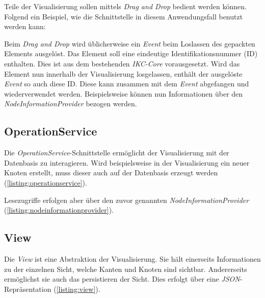 Teile der Visualisierung sollen mittels \textit{Drag and Drop} bedient werden können. Folgend ein Beispiel, wie die Schnittstelle in diesem Anwendungsfall benutzt werden kann:

Beim \textit{Drag and Drop} wird üblicherweise ein \textit{Event} beim Loslassen des gepackten Elements ausgelöst. Das Element soll eine eindeutige Identifikationsnummer (ID) enthalten. Dies ist aus dem bestehenden \textit{IKC-Core} vorausgesetzt. Wird das Element nun innerhalb der Visualisierung losgelassen, enthält der ausgelöste \textit{Event} so auch diese ID. Diese kann zusammen mit dem \textit{Event} abgefangen und wiederverwendet werden. Beispielsweise können nun Informationen über den \textit{NodeInformationProvider} bezogen werden.


\subsection{OperationService}
Die \textit{OperationService}-Schnittstelle ermöglicht der Visualisierung mit der Datenbasis zu interagieren. Wird beispielsweise in der Visualisierung ein neuer Knoten erstellt, muss dieser auch auf der Datenbasis erzeugt werden (\autoref{listing:operationservice}). 

Lesezugriffe erfolgen aber über den zuvor genannten \textit{NodeInformationProvider} (\autoref{listing:nodeinformationprovider}).


\subsection{View}
Die \textit{View} ist eine Abstraktion der Visualisierung. Sie hält einerseits Informationen zu der einzelnen Sicht, welche Kanten und Knoten sind sichtbar. Andererseits ermöglichst sie auch das persistieren der Sicht. Dies erfolgt über eine \textit{JSON}-Repräsentation (\autoref{listing:view}).

